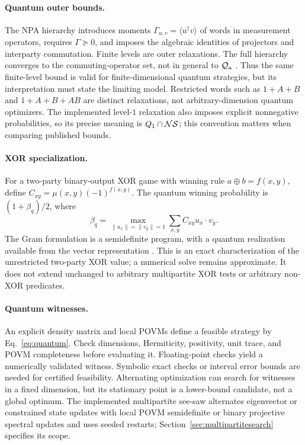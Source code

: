 \paragraph{Quantum outer bounds.}
The NPA hierarchy introduces moments
$\Gamma_{u,v}=\langle u^\dagger v\rangle$ of words in measurement operators,
requires $\Gamma\succeq0$, and imposes the algebraic identities of projectors
and interparty commutation. Finite levels are outer relaxations. The full
hierarchy converges to the commuting-operator set, not in general to
$\mathcal Q_{\rm a}$ \cite{npa2008}. Thus the same finite-level bound is valid for
finite-dimensional quantum strategies, but its interpretation must state the
limiting model. Restricted words such as $1+A+B$ and $1+A+B+AB$ are distinct
relaxations, not arbitrary-dimension quantum optimizers.
The implemented level-$1$ relaxation also imposes explicit nonnegative
probabilities, so its precise meaning is $Q_1\cap\mathcal{NS}$; this convention matters
when comparing published bounds.

\paragraph{XOR specialization.}
For a two-party binary-output XOR game with winning rule
$a\oplus b=f(x,y)$, define $C_{xy}=\mu(x,y)(-1)^{f(x,y)}$. The quantum winning
probability is $(1+\beta_q)/2$, where
\begin{equation}
 \beta_q=\max_{\|u_x\|=\|v_y\|=1}\sum_{x,y}C_{xy}u_x\cdot v_y.
 \label{eq:xor}
\end{equation}
The Gram formulation is a semidefinite program, with a quantum realization
available from the vector representation \cite{cleve2004}. This is an exact
characterization of the unrestricted two-party XOR value; a numerical solve
remains approximate. It does not extend unchanged to arbitrary multipartite
XOR tests or arbitrary non-XOR predicates.

\paragraph{Quantum witnesses.}
An explicit density matrix and local POVMs define a feasible strategy by
Eq.~\eqref{eq:quantum}. Check dimensions, Hermiticity, positivity, unit trace,
and POVM completeness before evaluating it. Floating-point checks yield a
numerically validated witness. Symbolic exact checks or interval error bounds
are needed for certified feasibility. Alternating optimization can search for
witnesses in a fixed dimension, but its stationary point is a lower-bound
candidate, not a global optimum.
The implemented multipartite see-saw alternates eigenvector or constrained state
updates with local POVM semidefinite or binary projective spectral updates and
uses seeded restarts; Section~\ref{sec:multipartitesearch} specifies its scope.

